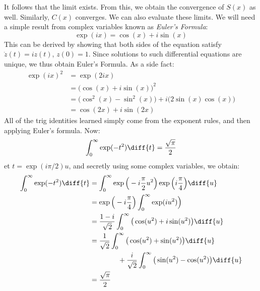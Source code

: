             It follows that the limit exists. From this, we obtain
            the convergence of $S(x)$ as well. Similarly, $C(x)$
            converges. We can also evaluate these limits. We will
            need a simple result from complex variables known as
            \textit{Euler's Formula}:
            \begin{equation}
                \exp(ix)=\cos(x)+i\sin(x)
            \end{equation}
            This can be derived by showing that both sides of the
            equation satisfy $\dot{z}(t)=iz(t)$, $z(0)=1$. Since
            solutions to such differential equations are unique,
            we thus obtain Euler's Formula. As a side fact:
            \begin{align}
                \exp(ix)^{2}&=\exp(2ix)\\
                &=\big(\cos(x)+i\sin(x)\big)^{2}\\
                &=\big(\cos^{2}(x)-\sin^{2}(x)\big)+
                i\big(2\sin(x)\cos(x)\big)\\
                &=\cos(2x)+i\sin(2x)
            \end{align}
            All of the trig identities learned simply come from
            the exponent rules, and then applying Euler's formula.
            Now:
            \begin{equation}
                \int_{0}^{\infty}\exp(-t^{2})\diff{t}
                =\frac{\sqrt{\pi}}{2}
            \end{equation}
            et $t=\exp(i\pi/2)u$, and secretly using some complex
            variables, we obtain:
            \begin{align}
                \int_{0}^{\infty}\exp(-t^{2})\diff{t}
                &=\int_{0}^{\infty}
                \exp\Big(-i\frac{\pi}{2}u^{2}\Big)
                \exp\Big(i\frac{\pi}{4}\Big)\diff{u}\\
                &=\exp\Big(-i\frac{\pi}{4}\Big)
                \int_{0}^{\infty}\exp(iu^{2})\Big)\\
                &=\frac{1-i}{\sqrt{2}}\int_{0}^{\infty}
                \big(\cos(u^{2})+i\sin(u^{2})\big)\diff{u}\\
                \nonumber&=\frac{1}{\sqrt{2}}\int_{0}^{\infty}
                    \big(\cos(u^{2})+\sin(u^{2})\big)\diff{u}\\
                &\quad\quad\quad\quad
                    +\frac{i}{\sqrt{2}}\int_{0}^{\infty}
                \big(\sin(u^{2})-\cos(u^{2})\big)\diff{u}\\
                &=\frac{\sqrt{\pi}}{2}
            \end{align}
